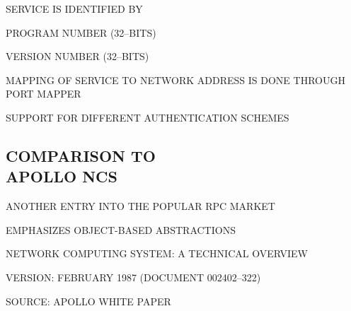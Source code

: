 \begin{bwslide}

\begin{nrtc}
\item	SERVICE IS IDENTIFIED BY
    \begin{nrtc}
    \item	PROGRAM NUMBER (32--BITS)

    \item	VERSION NUMBER (32--BITS)
    \end{nrtc}

\item	MAPPING OF SERVICE TO NETWORK ADDRESS IS DONE THROUGH PORT MAPPER

\item	SUPPORT FOR DIFFERENT AUTHENTICATION SCHEMES
\end{nrtc}
\end{bwslide}


\begin{bwslide}
\part*	{COMPARISON TO\\ APOLLO NCS}\bf

\begin{nrtc}
\item	ANOTHER ENTRY INTO THE POPULAR RPC MARKET

\item	EMPHASIZES OBJECT-BASED ABSTRACTIONS
\end{nrtc}
\end{bwslide}


\begin{bwslide}

\begin{nrtc}
\item	NETWORK COMPUTING SYSTEM: A TECHNICAL OVERVIEW
    \begin{nrtc}
    \item	VERSION: FEBRUARY 1987 (DOCUMENT 002402--322)

    \item	SOURCE: APOLLO WHITE PAPER
    \end{nrtc}
\end{nrtc}
\end{bwslide}


